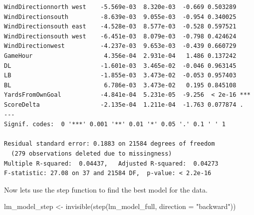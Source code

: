 \documentclass[
  super,
  preprint,
  3p]{elsarticle}
\newenvironment{Shaded}{\begin{snugshade}}{\end{snugshade}}
\newcommand{\AttributeTok}[1]{\textcolor[rgb]{0.40,0.45,0.13}{#1}}
\newcommand{\FunctionTok}[1]{\textcolor[rgb]{0.28,0.35,0.67}{#1}}
\newcommand{\NormalTok}[1]{\textcolor[rgb]{0.00,0.23,0.31}{#1}}
\newcommand{\OtherTok}[1]{\textcolor[rgb]{0.00,0.23,0.31}{#1}}
\newcommand{\StringTok}[1]{\textcolor[rgb]{0.13,0.47,0.30}{#1}}
\begin{document}
\begin{verbatim}
WindDirectionnorth west    -5.569e-03  8.320e-03  -0.669 0.503289    
WindDirectionsouth         -8.639e-03  9.055e-03  -0.954 0.340025    
WindDirectionsouth east    -4.528e-03  8.577e-03  -0.528 0.597521    
WindDirectionsouth west    -6.451e-03  8.079e-03  -0.798 0.424624    
WindDirectionwest          -4.237e-03  9.653e-03  -0.439 0.660729    
GameHour                    4.356e-04  2.931e-04   1.486 0.137242    
DL                         -1.601e-03  3.465e-02  -0.046 0.963145    
LB                         -1.855e-03  3.473e-02  -0.053 0.957403    
BL                          6.786e-03  3.473e-02   0.195 0.845108    
YardsFromOwnGoal           -4.841e-04  5.231e-05  -9.256  < 2e-16 ***
ScoreDelta                 -2.135e-04  1.211e-04  -1.763 0.077874 .  
---
Signif. codes:  0 '***' 0.001 '**' 0.01 '*' 0.05 '.' 0.1 ' ' 1

Residual standard error: 0.1883 on 21584 degrees of freedom
  (279 observations deleted due to missingness)
Multiple R-squared:  0.04437,   Adjusted R-squared:  0.04273 
F-statistic: 27.08 on 37 and 21584 DF,  p-value: < 2.2e-16
\end{verbatim}

Now lets use the step function to find the best model for the data.

\begin{Shaded}
\begin{Highlighting}[]
\NormalTok{lm\_model\_step }\OtherTok{\textless{}{-}} \FunctionTok{invisible}\NormalTok{(}\FunctionTok{step}\NormalTok{(lm\_model\_full, }\AttributeTok{direction =} \StringTok{"backward"}\NormalTok{))}
\end{Highlighting}
\end{Shaded}
\end{document}

